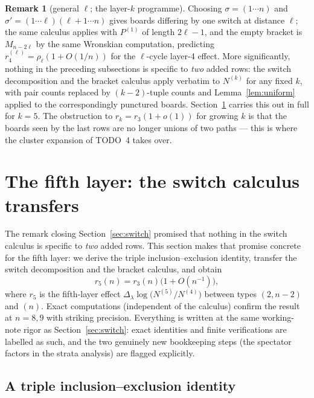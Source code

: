 \documentclass[11pt]{article}
\theoremstyle{definition}
\newtheorem{remark}[theorem]{Remark}
\begin{document}
\begin{remark}[general $\ell$; the layer-$k$ programme]
Choosing $\sigma=(1\cdots n)$ and $\sigma'=(1\cdots \ell)(\ell{+}1\cdots
n)$ gives boards differing by one switch at distance $\ell$; the same
calculus applies with $P^{(1)}$ of length $2\ell-1$, and the empty
bracket is $M_{n-2\ell}$ by the same Wronskian computation, predicting
$r_4^{(\ell)}=\rho_\ell(1+O(1/n))$ for the $\ell$-cycle layer-4 effect.
More significantly, nothing in the preceding subsections is specific to
\emph{two} added rows: the switch decomposition and the bracket calculus apply
verbatim to $N^{(k)}$ for any fixed $k$, with pair counts replaced by
$(k{-}2)$-tuple counts and Lemma~\ref{lem:uniform} applied to the
correspondingly punctured boards.  Section~\ref{sec:fifth} carries this
out in full for $k=5$.  The obstruction to
$r_k=r_3(1+o(1))$ for growing $k$ is that the boards seen by the last
rows are no longer unions of two paths --- this is where the cluster
expansion of TODO~4 takes over.
\end{remark}



\section{The fifth layer: the switch calculus transfers}\label{sec:fifth}

The remark closing Section~\ref{sec:switch} promised that nothing in the
switch calculus is specific to \emph{two} added rows.  This section makes
that promise concrete for the fifth layer: we derive the triple
inclusion--exclusion identity, transfer the switch decomposition and the
bracket calculus, and obtain
\begin{equation}\label{eq:r5thm}
r_5(n)=r_3(n)\bigl(1+O(n^{-1})\bigr),
\end{equation}
where $r_5$ is the fifth-layer effect
$\Delta_\lambda\log\bigl(N^{(5)}/N^{(4)}\bigr)$ between types $(2,n{-}2)$
and $(n)$.  Exact computations (independent of the calculus) confirm the
result at $n=8,9$ with striking precision.  Everything is written at the
same working-note rigor as Section~\ref{sec:switch}: exact identities and
finite verifications are labelled as such, and the two genuinely new
bookkeeping steps (the spectator factors in the strata analysis) are
flagged explicitly.

\subsection{A triple inclusion--exclusion identity}
\end{document}
